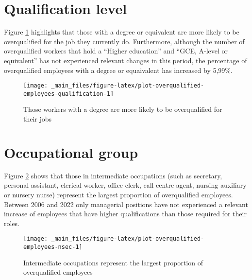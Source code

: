 \documentclass[
]{book}
\begin{document}
\hypertarget{qualification-level-2}{%
\section{Qualification level}\label{qualification-level-2}}

Figure \ref{fig:plot-overqualified-employees-qualification} highlights that those with a degree or equivalent are more likely to be overqualified for the job they currently do. Furthermore, although the number of overqualified workers that hold a ``Higher education'' and ``GCE, A-level or equivalent'' has not experienced relevant changes in this period, the percentage of overqualified employees with a degree or equaivalent has increased by 5,99\%.

\begin{figure}

{\centering \texttt{[image: \_main\_files/figure-latex/plot-overqualified-employees-qualification-1]} 

}

\caption{Those workers with a degree are more likely to be overqualified for their jobs}\label{fig:plot-overqualified-employees-qualification}
\end{figure}

\hypertarget{occupational-group-3}{%
\section{Occupational group}\label{occupational-group-3}}

Figure \ref{fig:plot-overqualified-employees-nsec} shows that those in intermediate occupations (such as secretary, personal assistant, clerical worker, office clerk, call centre agent, nursing auxiliary or nursery nurse) represent the largest proportion of overqualified employees. Between 2006 and 2022 only managerial positions have not experienced a relevant increase of employees that have higher qualifications than those required for their roles.

\begin{figure}

{\centering \texttt{[image: \_main\_files/figure-latex/plot-overqualified-employees-nsec-1]} 

}

\caption{Intermediate occupations represent the largest proportion of overqualified employees}\label{fig:plot-overqualified-employees-nsec}
\end{figure}
\end{document}
